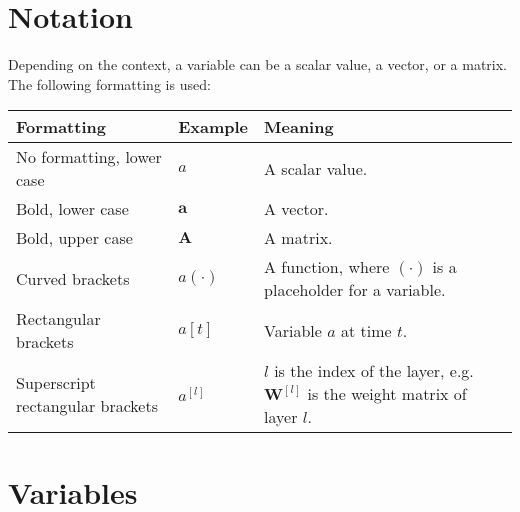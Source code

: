 \section{Notation}

Depending on the context, a variable can be a scalar value, a vector, or a matrix. The following formatting is used:

\renewcommand{\arraystretch}{1.3}
\begin{tabular}{ p{5cm} p{2cm} p{7cm} }
	\textbf{Formatting} & \textbf{Example} & \textbf{Meaning}\\
	\hline
  	No formatting, lower case & $a$ & A scalar value.\\
  	Bold, lower case & $\boldsymbol{a}$ & A vector.\\
  	Bold, upper case & $\boldsymbol{A}$ & A matrix.\\
  	Curved brackets & $a(\cdot)$ & A function, where $(\cdot)$ is a placeholder for a variable.\\
  	Rectangular brackets & $a[t]$ & Variable $a$ at time $t$.\\
   Superscript rectangular brackets & $a^{[l]}$ & $l$ is the index of the layer, e.g. $\boldsymbol{W}^{[l]}$ is the weight matrix of layer $l$.\\
\end{tabular}

\section{Variables}

